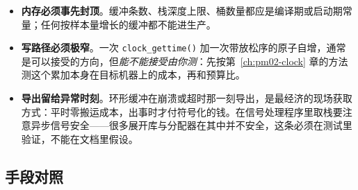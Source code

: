 \documentclass[12pt,a4paper,fontset=fandol]{ctexbook}
\newcommand{\Fn}[1]{\texttt{#1()}}
\newcommand{\Bk}{\discretionary{}{}{}}
\begin{document}
\begin{itemize}
  \item \textbf{内存必须事先封顶}。缓冲条数、栈深度上限、桶数量都应是编译期或启动期常量；任何按样本量增长的缓冲都不能进生产。
  \item \textbf{写路径必须极窄}。一次 \Fn{clock{\Bk}\_gettime} 加一次带放松序的原子自增，通常是可以接受的方向，但\emph{能不能接受由你测}：先按第~\ref{ch:pm02-clock} 章的方法测这个累加本身在目标机器上的成本，再和预算比。
  \item \textbf{导出留给异常时刻}。环形缓冲在崩溃或超时那一刻导出，是最经济的现场获取方式：平时零搬运成本，出事时才付符号化的钱。在信号处理程序里取栈要注意异步信号安全——很多展开库与分配器在其中并不安全，这条必须在测试里验证，不能在文档里假设。
\end{itemize}

\subsection{手段对照}
\label{sub:pm14-method-table}
\end{document}
